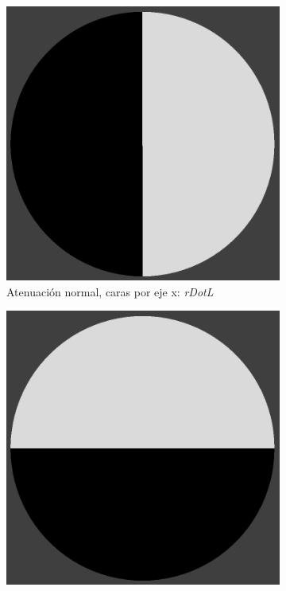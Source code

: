 \begin{figure}[H]
	\centering
	\begin{subfigure}[t]{0.2\textwidth}
		\centering
		\captionsetup{justification=centering}
		\includegraphics[width=\linewidth]{media/ndotR.png}
		\caption*{Atenuación normal, caras por eje x: \emph{rDotL}}
	\end{subfigure}%
	\begin{subfigure}[t]{0.2\textwidth}
		\centering
		\captionsetup{justification=centering}
		\includegraphics[width=\linewidth]{media/ndotU.png}

\end{subfigure}
\end{figure}
